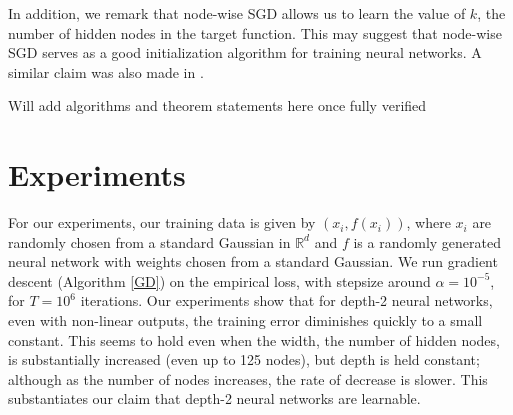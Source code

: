 \documentclass{article}
\newcommand{\R}{{\mathbb{R}}}
\newcommand{\todo}[1]{\colorbox{Mygray}{\color{red}#1}}
\newcommand{\todo}[1]{#1}
\begin{document}
In addition, we remark that node-wise SGD allows us to learn the value of $k$, the number of hidden nodes in the target function. This may suggest that node-wise SGD serves as a good initialization algorithm for training neural networks. A similar claim was also made in \cite{WuM16}. 

\todo{Will add algorithms and theorem statements here once fully verified}
 
\section{Experiments}
\label{experiments}
For our experiments, our training data is given by $(x_i, f(x_i))$, where $x_i$ are randomly chosen from a standard Gaussian in $\R^d$ and $f$ is a randomly generated neural network with weights chosen from a standard Gaussian. We run gradient descent (Algorithm \ref{GD}) on the empirical loss, with stepsize around $\alpha = 10^{-5}$, for $T = 10^6$ iterations. Our experiments show that for depth-2 neural networks, even with non-linear outputs, the training error diminishes quickly to a small constant. This seems to hold even when the width, the number of hidden nodes, is substantially increased (even up to 125 nodes), but depth is held constant; although as the number of nodes increases, the rate of decrease is slower. This substantiates our claim that depth-2 neural networks are learnable.
\end{document}
